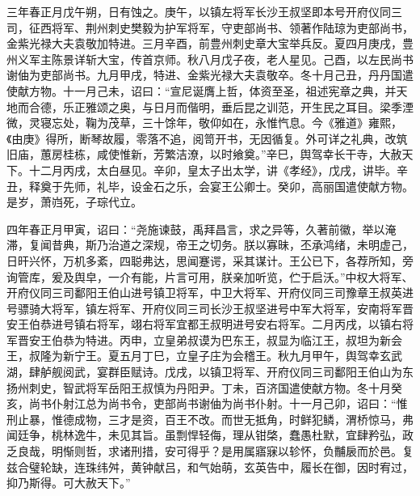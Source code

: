 \documentclass[]{article}
\begin{document}
三年春正月戊午朔，日有蚀之。庚午，以镇左将军长沙王叔坚即本号开府仪同三司，征西将军、荆州刺史樊毅为护军将军，守吏部尚书、领著作陆琼为吏部尚书，金紫光禄大夫袁敬加特进。三月辛酉，前豊州刺史章大宝举兵反。夏四月庚戌，豊州义军主陈景详斩大宝，传首京师。秋八月戊子夜，老人星见。己酉，以左民尚书谢伷为吏部尚书。九月甲戌，特进、金紫光禄大夫袁敬卒。冬十月己丑，丹丹国遣使献方物。十一月己未，诏曰：``宣尼诞膺上哲，体资至圣，祖述宪章之典，并天地而合德，乐正雅颂之奥，与日月而偕明，垂后昆之训范，开生民之耳目。梁季湮微，灵寝忘处，鞠为茂草，三十馀年，敬仰如在，永惟忾息。今《雅道》雍熙，《由庚》得所，断琴故履，零落不追，阅笥开书，无因循复。外可详之礼典，改筑旧庙，蕙房桂栋，咸使惟新，芳繁洁潦，以时飨奠。''辛巳，舆驾幸长干寺，大赦天下。十二月丙戌，太白昼见。辛卯，皇太子出太学，讲《孝经》，戊戌，讲毕。辛丑，释奠于先师，礼毕，设金石之乐，会宴王公卿士。癸卯，高丽国遣使献方物。是岁，萧岿死，子琮代立。

四年春正月甲寅，诏曰：``尧施谏鼓，禹拜昌言，求之异等，久著前徽，举以淹滞，复闻昔典，斯乃治道之深规，帝王之切务。朕以寡昧，丕承鸿绪，未明虚己，日旰兴怀，万机多紊，四聪弗达，思闻蹇谔，采其谋计。王公已下，各荐所知，旁询管库，爰及舆皁，一介有能，片言可用，朕亲加听览，伫于启沃。''中权大将军、开府仪同三司鄱阳王伯山进号镇卫将军，中卫大将军、开府仪同三司豫章王叔英进号骠骑大将军，镇左将军、开府仪同三司长沙王叔坚进号中军大将军，安南将军晋安王伯恭进号镇右将军，翊右将军宜都王叔明进号安右将军。二月丙戌，以镇右将军晋安王伯恭为特进。丙申，立皇弟叔谟为巴东王，叔显为临江王，叔坦为新会王，叔隆为新宁王。夏五月丁巳，立皇子庄为会稽王。秋九月甲午，舆驾幸玄武湖，肆舻舰阅武，宴群臣赋诗。戊戌，以镇卫将军、开府仪同三司鄱阳王伯山为东扬州刺史，智武将军岳阳王叔慎为丹阳尹。丁未，百济国遣使献方物。冬十月癸亥，尚书仆射江总为尚书令，吏部尚书谢伷为尚书仆射。十一月己卯，诏曰：``惟刑止暴，惟德成物，三才是资，百王不改。而世无抵角，时鲜犯鳞，渭桥惊马，弗闻廷争，桃林逸牛，未见其旨。虽剽悍轻侮，理从钳棨，蠢愚杜默，宜肆矜弘，政乏良哉，明惭则哲，求诸刑措，安可得乎？是用属寤寐以轸怀，负黼扆而於邑。复兹合璧轮缺，连珠纬舛，黄钟献吕，和气始萌，玄英告中，履长在御，因时宥过，抑乃斯得。可大赦天下。''
\end{document}
